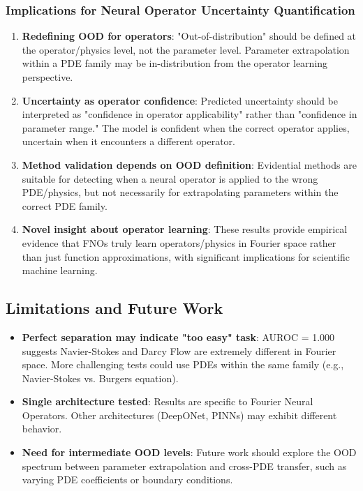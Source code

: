 \subsubsection{Implications for Neural Operator Uncertainty Quantification}

\begin{enumerate}
\item \textbf{Redefining OOD for operators}: "Out-of-distribution" should be defined at the operator/physics level, not the parameter level. Parameter extrapolation within a PDE family may be in-distribution from the operator learning perspective.

\item \textbf{Uncertainty as operator confidence}: Predicted uncertainty should be interpreted as "confidence in operator applicability" rather than "confidence in parameter range." The model is confident when the correct operator applies, uncertain when it encounters a different operator.

\item \textbf{Method validation depends on OOD definition}: Evidential methods are suitable for detecting when a neural operator is applied to the wrong PDE/physics, but not necessarily for extrapolating parameters within the correct PDE family.

\item \textbf{Novel insight about operator learning}: These results provide empirical evidence that FNOs truly learn operators/physics in Fourier space rather than just function approximations, with significant implications for scientific machine learning.
\end{enumerate}

\subsection{Limitations and Future Work}

\begin{itemize}
\item \textbf{Perfect separation may indicate "too easy" task}: AUROC = 1.000 suggests Navier-Stokes and Darcy Flow are extremely different in Fourier space. More challenging tests could use PDEs within the same family (e.g., Navier-Stokes vs. Burgers equation).

\item \textbf{Single architecture tested}: Results are specific to Fourier Neural Operators. Other architectures (DeepONet, PINNs) may exhibit different behavior.

\item \textbf{Need for intermediate OOD levels}: Future work should explore the OOD spectrum between parameter extrapolation and cross-PDE transfer, such as varying PDE coefficients or boundary conditions.
\end{itemize}


